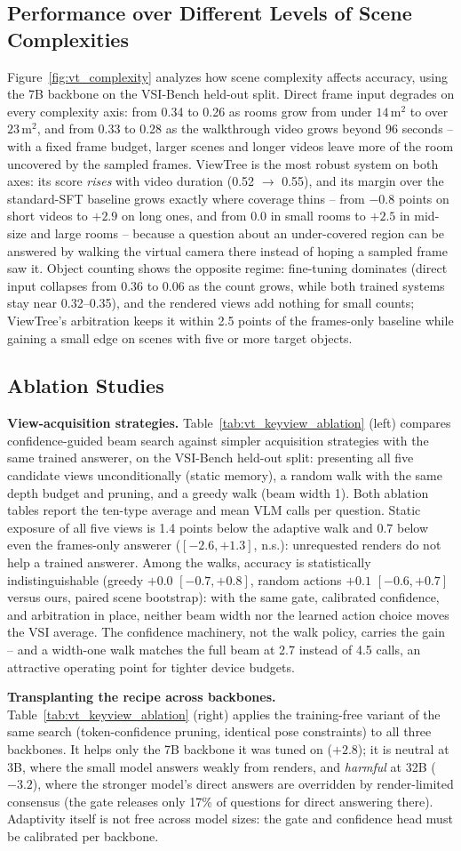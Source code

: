 \documentclass[sigconf,10pt]{acmart}
\newcommand{\system}{ViewTree\xspace}
\newcommand{\abviewtext}{Static exposure of all five views is 1.4 points below the adaptive walk and 0.7 below even the frames-only answerer ($[-2.6, +1.3]$, n.s.): unrequested renders do not help a trained answerer. Among the walks, accuracy is statistically indistinguishable (greedy $+0.0$ $[-0.7, +0.8]$, random actions $+0.1$ $[-0.6, +0.7]$ versus ours, paired scene bootstrap): with the same gate, calibrated confidence, and arbitration in place, neither beam width nor the learned action choice moves the VSI average. The confidence machinery, not the walk policy, carries the gain -- and a width-one walk matches the full beam at 2.7 instead of 4.5 calls, an attractive operating point for tighter device budgets.}
\begin{document}
\subsection{Performance over Different Levels of Scene Complexities}
\label{sec:complexity}

Figure~\ref{fig:vt_complexity} analyzes how scene complexity affects accuracy, using the 7B backbone on the VSI-Bench held-out split. Direct frame input degrades on every complexity axis: from 0.34 to 0.26 as rooms grow from under $14\,\mathrm{m}^2$ to over $23\,\mathrm{m}^2$, and from 0.33 to 0.28 as the walkthrough video grows beyond 96 seconds -- with a fixed frame budget, larger scenes and longer videos leave more of the room uncovered by the sampled frames. \system is the most robust system on both axes: its score \emph{rises} with video duration (0.52 $\rightarrow$ 0.55), and its margin over the standard-SFT baseline grows exactly where coverage thins -- from $-0.8$ points on short videos to $+2.9$ on long ones, and from $0.0$ in small rooms to $+2.5$ in mid-size and large rooms -- because a question about an under-covered region can be answered by walking the virtual camera there instead of hoping a sampled frame saw it. Object counting shows the opposite regime: fine-tuning dominates (direct input collapses from 0.36 to 0.06 as the count grows, while both trained systems stay near 0.32--0.35), and the rendered views add nothing for small counts; \system's arbitration keeps it within 2.5 points of the frames-only baseline while gaining a small edge on scenes with five or more target objects.

\vspace{-0.1in}
\subsection{Ablation Studies}
\label{sec:ablation}

\noindent\textbf{View-acquisition strategies.} Table~\ref{tab:vt_keyview_ablation} (left) compares confidence-guided beam search against simpler acquisition strategies with the same trained answerer, on the VSI-Bench held-out split: presenting all five candidate views unconditionally (static memory), a random walk with the same depth budget and pruning, and a greedy walk (beam width 1). Both ablation tables report the ten-type average and mean VLM calls per question. \abviewtext{}

\noindent\textbf{Transplanting the recipe across backbones.} Table~\ref{tab:vt_keyview_ablation} (right) applies the training-free variant of the same search (token-confidence pruning, identical pose constraints) to all three backbones. It helps only the 7B backbone it was tuned on ($+2.8$); it is neutral at 3B, where the small model answers weakly from renders, and \emph{harmful} at 32B ($-3.2$), where the stronger model's direct answers are overridden by render-limited consensus (the gate releases only 17\% of questions for direct answering there). Adaptivity itself is not free across model sizes: the gate and confidence head must be calibrated per backbone.
\end{document}
